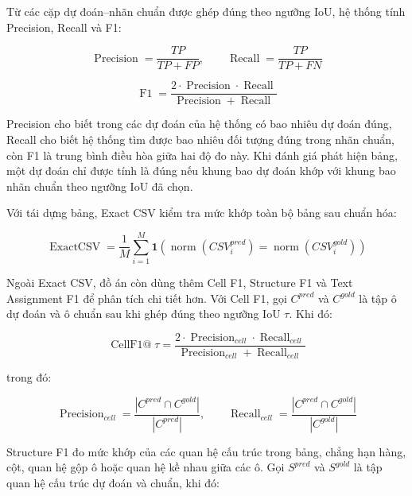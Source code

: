\documentclass[../DoAn.tex]{subfiles}
\begin{document}
Từ các cặp dự đoán--nhãn chuẩn được ghép đúng theo ngưỡng IoU, hệ thống tính
Precision, Recall và F1:

\begin{equation}
\label{eq:table-precision-recall}
\operatorname{Precision} =
\frac{TP}{TP+FP},
\qquad
\operatorname{Recall} =
\frac{TP}{TP+FN}
\end{equation}

\begin{equation}
\label{eq:table-f1}
\operatorname{F1} =
\frac{2 \cdot \operatorname{Precision} \cdot \operatorname{Recall}}
{\operatorname{Precision}+\operatorname{Recall}}
\end{equation}

Precision cho biết trong các dự đoán của hệ thống có bao nhiêu dự đoán đúng,
Recall cho biết hệ thống tìm được bao nhiêu đối tượng đúng trong nhãn chuẩn,
còn F1 là trung bình điều hòa giữa hai độ đo này. Khi đánh giá phát hiện bảng,
một dự đoán chỉ được tính là đúng nếu khung bao dự đoán khớp với khung bao nhãn chuẩn
theo ngưỡng IoU đã chọn.

Với tái dựng bảng, Exact CSV kiểm tra mức khớp toàn bộ bảng sau chuẩn hóa:

\begin{equation}
\label{eq:exact-csv}
\operatorname{ExactCSV} =
\frac{1}{M}
\sum_{i=1}^{M}
\mathbf{1}
\left(
\operatorname{norm}(CSV_i^{pred}) =
\operatorname{norm}(CSV_i^{gold})
\right)
\end{equation}

Ngoài Exact CSV, đồ án còn dùng thêm Cell F1, Structure F1 và Text Assignment F1
để phân tích chi tiết hơn. Với Cell F1, gọi \(C^{pred}\) và \(C^{gold}\) là tập
ô dự đoán và ô chuẩn sau khi ghép đúng theo ngưỡng IoU \(\tau\). Khi đó:

\begin{equation}
\label{eq:cell-f1}
\operatorname{CellF1@}\tau =
\frac{2 \cdot \operatorname{Precision}_{cell} \cdot \operatorname{Recall}_{cell}}
{\operatorname{Precision}_{cell}+\operatorname{Recall}_{cell}}
\end{equation}

trong đó:

\begin{equation}
\label{eq:cell-precision-recall}
\operatorname{Precision}_{cell} =
\frac{|C^{pred} \cap C^{gold}|}{|C^{pred}|},
\qquad
\operatorname{Recall}_{cell} =
\frac{|C^{pred} \cap C^{gold}|}{|C^{gold}|}
\end{equation}

Structure F1 đo mức khớp của các quan hệ cấu trúc trong bảng, chẳng hạn hàng,
cột, quan hệ gộp ô hoặc quan hệ kề nhau giữa các ô. Gọi \(S^{pred}\) và \(S^{gold}\) là tập
quan hệ cấu trúc dự đoán và chuẩn, khi đó:
\end{document}
